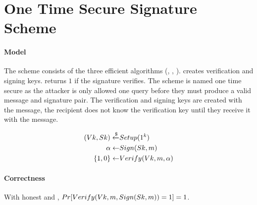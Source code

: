 \begin{comment}
There is a problem with this proof approach. The construction is fine but it has a subtlety.

We are changing from $\Sk_1$ to $\Sk_2$ after we switched to the simulated proof.


Define event Fake to be the event such that $\exists i \in [q]$ such that
$C_i = (C_{1,i}, C_{2,i}, \pi_i)$
where
$\pi$ is valid
but
$\Dec(\Sk_1, C_{1,i}) \neq \Dec(\Sk_2, C_{2,i})$

At $H_0$, the changes of event fake are negligible as we are using the normal system with randomly generated random string.

At $H_1$, fake must have the same probability as in $H_0$ otherwise. TODO

argue changes of event fake are still negligible as otherwise we can distinguish between $H_0$ and  $H_1$.

At $H_3$, they are still negligible so we can switch to $\Sk_2$.

This argument will not hold for a CCA2 attack.


\end{comment}


\section{One Time Secure Signature Scheme}

\paragraph{Model}
The scheme consists of the three efficient algorithms (\Setup, \Sign, \Verify). \Setup creates verification and signing keys. \Verify returns $1$ if the signature verifies. The scheme is named  one time secure as the attacker is only allowed one query before they must produce a valid message and signature pair. The verification and signing keys are created with the message, the recipient does not know the verification key until they receive it with the message.

\begin{align*}
(Vk, Sk) \xleftarrow{\text{\$}} & Setup(1^k) \\
\alpha   \leftarrow & Sign(Sk, m)  \\
\{1,0\}  \leftarrow & Verify(Vk, m, \alpha) \\
\end{align*}

\paragraph{Correctness}
With honest \Setup and \Sign, $Pr[Verify(Vk, m, Sign(Sk, m)) = 1] =1$.

